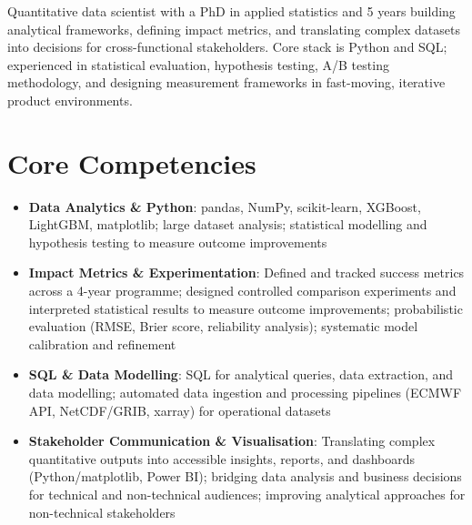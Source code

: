 \documentclass[11pt,a4paper,sans]{moderncv}
\begin{document}
\makecvtitle
\enlargethispage{8\baselineskip}


\vspace{2pt}
\small{Quantitative data scientist with a PhD in applied statistics and 5 years building analytical frameworks, defining impact metrics, and translating complex datasets into decisions for cross-functional stakeholders. Core stack is Python and SQL; experienced in statistical evaluation, hypothesis testing, A/B testing methodology, and designing measurement frameworks in fast-moving, iterative product environments.}


\section{Core Competencies}
\vspace{1pt}
\begin{itemize}

\item \textbf{Data Analytics \& Python}: pandas, NumPy, scikit-learn, XGBoost, LightGBM, matplotlib; large dataset analysis; statistical modelling and hypothesis testing to measure outcome improvements

\item \textbf{Impact Metrics \& Experimentation}: Defined and tracked success metrics across a 4-year programme; designed controlled comparison experiments and interpreted statistical results to measure outcome improvements; probabilistic evaluation (RMSE, Brier score, reliability analysis); systematic model calibration and refinement

\item \textbf{SQL \& Data Modelling}: SQL for analytical queries, data extraction, and data modelling; automated data ingestion and processing pipelines (ECMWF API, NetCDF/GRIB, xarray) for operational datasets

\item \textbf{Stakeholder Communication \& Visualisation}: Translating complex quantitative outputs into accessible insights, reports, and dashboards (Python/matplotlib, Power BI); bridging data analysis and business decisions for technical and non-technical audiences; improving analytical approaches for non-technical stakeholders

\end{itemize}
\end{document}
